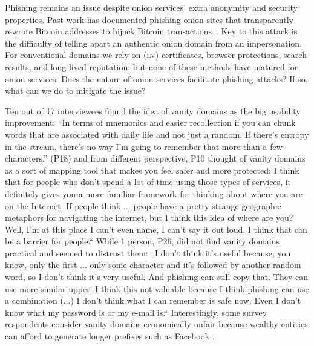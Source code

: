 Phishing remains an issue despite onion services' extra anonymity and security
properties.  Past work has documented phishing onion sites that transparently
rewrote Bitcoin addresses to hijack Bitcoin
transactions~\cite{Winter2016a,Nurmi2015a,Monteiro2016a}.  Key to this attack is
the difficulty of telling apart an authentic onion domain from an impersonation.
For conventional domains we rely on (\textsc{ev}) certificates, browser
protections, search results, and long-lived reputation, but none of these
methods have matured for onion services.  Does the nature of onion services
facilitate phishing attacks?  If so, what can we do to mitigate the issue?


Ten out of 17 interviewees found the idea of vanity domains as the big usability improvement: “In terms of mnemonics and easier recollection if you can chunk words that are associated with daily life and not just a random. If there's entropy in the stream, there's no way I'm going to remember that more than a few characters.” (P18) and from different perspective, P10 thought of vanity domains as a sort of mapping tool that makes you feel safer and more protected: I think that for people who don't spend a lot of time using those types of services, it definitely gives you a more familiar framework for thinking about where you are on the Internet. If people think ... people have a pretty strange geographic metaphors for navigating the internet, but I think this idea of where are you? Well, I'm at this place I can't even name, I can't say it out loud, I think that can be a barrier for people.“ While 1 person, P26, did not find vanity domains practical and seemed to distrust them: „I don't think it's useful because, you know, only the first ... only some character and it's followed by another random word, so I don't think it's very useful. And phishing can still copy that. They can use more similar upper. I think this not valuable because I think phishing can use a combination (...) I don't think what I can remember is safe now. Even I don't know what my password is or my e-mail is.“ Interestingly, some  survey
respondents consider vanity domains economically unfair because wealthy entities
can afford to generate longer prefixes such as Facebook .


